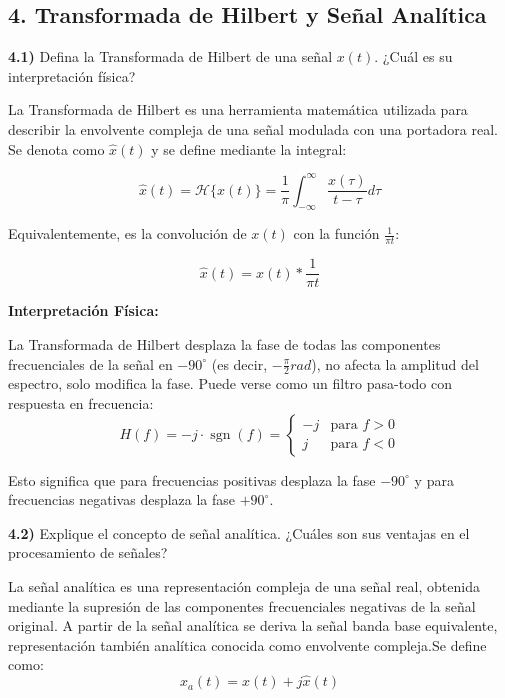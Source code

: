 \subsection*{4. Transformada de Hilbert y Señal Analítica}

\noindent \textbf{4.1)} Defina la Transformada de Hilbert de una señal \(x(t)\). ¿Cuál es su interpretación física?
\bigskip

La Transformada de Hilbert es una herramienta matemática utilizada para describir la envolvente compleja de una señal modulada con una portadora real. Se denota como \( \hat{x}(t) \) y se define mediante la integral:

\[
\hat{x}(t) = \mathcal{H}\{x(t)\} = \frac{1}{\pi} \int_{-\infty}^{\infty} \frac{x(\tau)}{t - \tau}  d\tau
\]

Equivalentemente, es la convolución de \( x(t) \) con la función \( \frac{1}{\pi t} \):

\[
\hat{x}(t) = x(t) * \frac{1}{\pi t}
\]

\noindent \textbf{Interpretación Física:} \par
    \noindent La Transformada de Hilbert desplaza la fase de todas las componentes frecuenciales de la señal en \(-90^\circ\) (es decir, \( -\frac{\pi}{2} rad\)), no afecta la amplitud del espectro, solo modifica la fase. Puede verse como un filtro pasa-todo con respuesta en frecuencia:
    \[
    H(f) = -j \cdot \operatorname{sgn}(f) = 
    \begin{cases}
        -j & \text{para } f > 0 \\
        j & \text{para } f < 0
    \end{cases}
    \]

    \noindent Esto significa que para frecuencias positivas desplaza la fase \(-90^\circ\) y para frecuencias negativas desplaza la fase \(+90^\circ\).\par
    \bigskip


\noindent \textbf{4.2)} Explique el concepto de señal analítica. ¿Cuáles son sus ventajas en el procesamiento de señales?\par
\bigskip

\noindent La señal analítica es una representación compleja de una señal real, obtenida mediante la supresión de las componentes frecuenciales negativas de la señal original. A partir de la señal analítica se deriva la señal banda base equivalente, representación también analítica conocida como envolvente compleja.Se define como:
                        \[
                        x_a(t) = x(t) + j\hat{x}(t)
                        \]
                        
